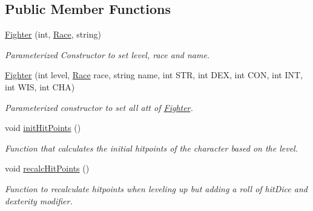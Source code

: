 \subsection*{Public Member Functions}
\begin{DoxyCompactItemize}
\item 
\hypertarget{class_fighter_ad1fcbd2f4c389221611e379f3df46ca8}{}\label{class_fighter_ad1fcbd2f4c389221611e379f3df46ca8} 
\hyperlink{class_fighter_ad1fcbd2f4c389221611e379f3df46ca8}{Fighter} (int, \hyperlink{_entity_8h_aa2df4028f474807638d438104900b003}{Race}, string)
\begin{DoxyCompactList}\small\item\em Parameterized Constructor to set level, race and name. \end{DoxyCompactList}\item 
\hypertarget{class_fighter_a601ebcca9ea2287c54a0995dc11a117c}{}\label{class_fighter_a601ebcca9ea2287c54a0995dc11a117c} 
\hyperlink{class_fighter_a601ebcca9ea2287c54a0995dc11a117c}{Fighter} (int level, \hyperlink{_entity_8h_aa2df4028f474807638d438104900b003}{Race} race, string name, int S\+TR, int D\+EX, int C\+ON, int I\+NT, int W\+IS, int C\+HA)
\begin{DoxyCompactList}\small\item\em Parameterized constructor to set all att of \hyperlink{class_fighter}{Fighter}. \end{DoxyCompactList}\item 
\hypertarget{class_fighter_a5bfd7630b47d4bf3b7b1288195bbad07}{}\label{class_fighter_a5bfd7630b47d4bf3b7b1288195bbad07} 
void \hyperlink{class_fighter_a5bfd7630b47d4bf3b7b1288195bbad07}{init\+Hit\+Points} ()
\begin{DoxyCompactList}\small\item\em Function that calculates the initial hitpoints of the character based on the level. \end{DoxyCompactList}\item 
\hypertarget{class_fighter_a82d21934022da1ffe16396e5fb407897}{}\label{class_fighter_a82d21934022da1ffe16396e5fb407897} 
void \hyperlink{class_fighter_a82d21934022da1ffe16396e5fb407897}{recalc\+Hit\+Points} ()
\begin{DoxyCompactList}\small\item\em Function to recalculate hitpoints when leveling up but adding a roll of hit\+Dice and dexterity modifier. \end{DoxyCompactList}\item 
\hypertarget{class_fighter_a9e63e29c35aaca0bc60ee46efe00cc62}{}\label{class_fighter_a9e63e29c35aaca0bc60ee46efe00cc62} 

\end{DoxyCompactItemize}

